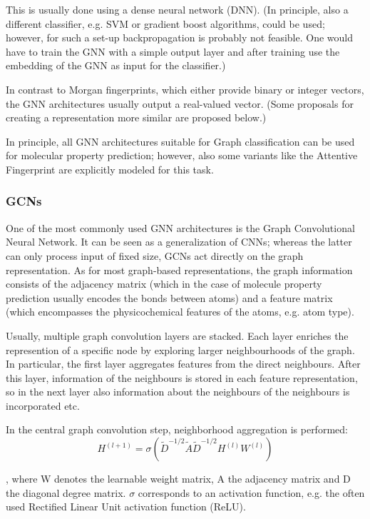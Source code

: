 This is usually done using a dense neural network (DNN). (In principle, also a different classifier, e.g. SVM or gradient boost algorithms, could be used; however, for such a set-up backpropagation is probably not feasible. One would have to train the GNN with a simple output layer and after training use the embedding of the GNN as input for the classifier.)

In contrast to Morgan fingerprints, which either provide binary or integer vectors, the GNN architectures usually output a real-valued vector. (Some proposals for creating a representation more similar are proposed below.)

In principle, all GNN architectures suitable for Graph classification can be used for molecular property prediction; however, also some variants like the Attentive Fingerprint are explicitly modeled for this task.

\subsubsection{GCNs}

One of the most commonly used GNN architectures is the Graph Convolutional Neural Network. It can be seen as a generalization of CNNs; whereas the latter can only process input of fixed size, GCNs act directly on the graph representation. As for most graph-based representations, the graph information consists of the adjacency matrix (which in the case of molecule property prediction usually encodes the bonds between atoms) and a feature matrix (which encompasses the physicochemical features of the atoms, e.g. atom type).

Usually, multiple graph convolution layers are stacked. Each layer enriches the represention of a specific node by exploring larger neighbourhoods of the graph. In particular, the first layer aggregates features from the direct neighbours. After this layer, information of the neighbours is stored in each feature representation, so in the next layer also information about the neighbours of the neighbours is incorporated etc.

In the central graph convolution step, neighborhood aggregation is performed: 
\begin{equation}
H^{(l+1)} = \sigma\left(\tilde{D}^{-1/2} \tilde{A} \tilde{D}^{-1/2} H^{(l)} W^{(l)}\right)
\end{equation}


, where W denotes the learnable weight matrix, A the adjacency matrix and D the diagonal degree matrix. \begin{math}\sigma\end{math} corresponds to an activation function, e.g. the often used Rectified Linear Unit activation function (ReLU).


